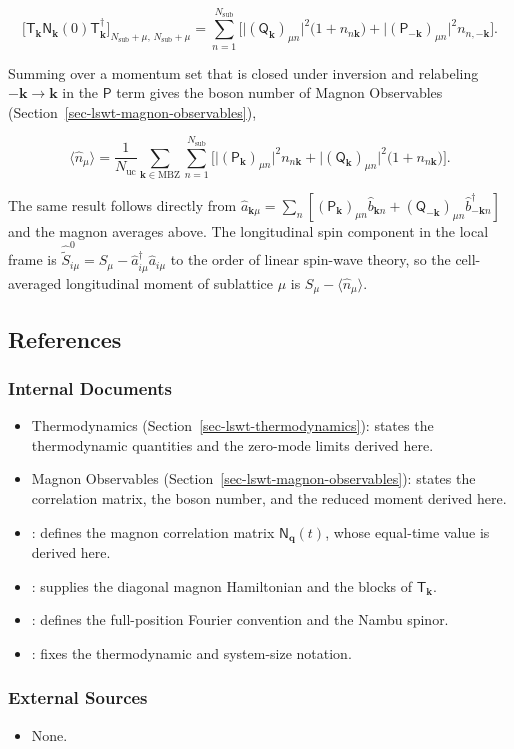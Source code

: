 \[
\Big[\mathsf T_{\mathbf k}\mathsf N_{\mathbf k}(0)\mathsf T_{\mathbf k}^\dagger\Big]_{N_{\mathrm{sub}}+\mu,\,N_{\mathrm{sub}}+\mu}
=\sum_{n=1}^{N_{\mathrm{sub}}}\Big[\big|(\mathsf Q_{\mathbf k})_{\mu n}\big|^2\big(1+n_{n\mathbf k}\big)+\big|(\mathsf P_{-\mathbf k})_{\mu n}\big|^2n_{n,-\mathbf k}\Big].
\]

Summing over a momentum set that is closed under inversion and relabeling \(-\mathbf k\to\mathbf k\) in the \(\mathsf P\) term gives the boson number of Magnon Observables (Section~\ref{sec-lswt-magnon-observables}),

\[
\langle\hat n_\mu\rangle=\frac{1}{N_{\mathrm{uc}}}\sum_{\mathbf k\in\mathrm{MBZ}}\sum_{n=1}^{N_{\mathrm{sub}}}\Big[\big|(\mathsf P_{\mathbf k})_{\mu n}\big|^2n_{n\mathbf k}+\big|(\mathsf Q_{\mathbf k})_{\mu n}\big|^2\big(1+n_{n\mathbf k}\big)\Big].
\]

The same result follows directly from \(\hat a_{\mathbf k\mu}=\sum_n[(\mathsf P_{\mathbf k})_{\mu n}\hat b_{\mathbf kn}+(\mathsf Q_{-\mathbf k})_{\mu n}\hat b_{-\mathbf kn}^\dagger]\) and the magnon averages above. The longitudinal spin component in the local frame is \(\hat{\widetilde S}_{i\mu}^0=S_\mu-\hat a_{i\mu}^\dagger\hat a_{i\mu}\) to the order of linear spin-wave theory, so the cell-averaged longitudinal moment of sublattice \(\mu\) is \(S_\mu-\langle\hat n_\mu\rangle\).

\subsection{References}

\subsubsection{Internal Documents}

\begin{itemize}
\tightlist
\item
  Thermodynamics (Section~\ref{sec-lswt-thermodynamics}): states the thermodynamic quantities and the zero-mode limits derived here.
\item
  Magnon Observables (Section~\ref{sec-lswt-magnon-observables}): states the correlation matrix, the boson number, and the reduced moment derived here.
\item
  : defines the magnon correlation matrix \(\mathsf N_{\mathbf q}(t)\), whose equal-time value is derived here.
\item
  : supplies the diagonal magnon Hamiltonian and the blocks of \(\mathsf T_{\mathbf k}\).
\item
  : defines the full-position Fourier convention and the Nambu spinor.
\item
  : fixes the thermodynamic and system-size notation.
\end{itemize}

\subsubsection{External Sources}

\begin{itemize}
\tightlist
\item
  None.
\end{itemize}
